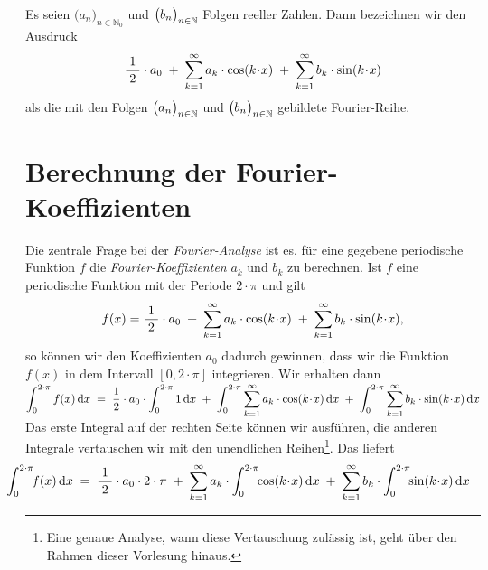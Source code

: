 \begin{Definition}
  Es seien $\bigl(a_n)_{n\in\mathbb{N}_0}$ und $\bigl(b_n\bigr)_{n\in\mathbb{N}}$ Folgen reeller Zahlen.  Dann bezeichnen
  wir den Ausdruck
  \begin{equation}
    \label{eq:fourier}
    \displaystyle\frac{\;\displaystyle1\;}{\;\displaystyle2\;}\cdot a_0 \;+\; \sum\limits_{k=1}^\infty a_k\cdot \cos(k\!\cdot\!x) \;+\;
                               \sum\limits_{k=1}^\infty b_k\cdot \sin(k\!\cdot\!x) 
  \end{equation}
  als die mit den Folgen $\bigl(a_n\bigr)_{n\in\mathbb{N}}$ und $\bigl(b_n\bigr)_{n\in\mathbb{N}}$ gebildete Fourier-Reihe.
\end{Definition}

\section{Berechnung der Fourier-Koeffizienten}
Die zentrale Frage bei der \emph{Fourier-Analyse} ist es, f\"ur eine gegebene periodische Funktion
$f$ die \emph{Fourier-Koeffizienten} $a_k$ und $b_k$ zu berechnen.   Ist $f$ eine
periodische Funktion mit der Periode $2\cdot\pi$ und gilt 
\begin{equation}
  \label{eq:fourierEq}
    f(x) = \displaystyle\frac{\;\displaystyle1\;}{\;\displaystyle2\;}\cdot a_0 \;+\; \sum\limits_{k=1}^\infty a_k\cdot \cos(k\!\cdot\!x) \;+\;
                                      \sum\limits_{k=1}^\infty b_k\cdot \sin(k\!\cdot\!x), 
\end{equation}
so k\"onnen wir den Koeffizienten $a_0$ dadurch gewinnen, dass wir die Funktion $f(x)$ in
dem Intervall $[0,2\cdot\pi]$ integrieren.  Wir erhalten dann
\\[0.3cm]
\hspace*{0.8cm}
$\displaystyle \int_0^{2\cdot\pi}f(x)\,\textrm{d} x \; = \; 
    \frac{1}{2}\cdot a_0 \cdot \int_0^{2\cdot\pi} 1\,\textrm{d} x \;+\; 
    \int_0^{2\cdot\pi} \sum\limits_{k=1}^\infty a_k\cdot \cos(k\!\cdot\!x) \,\textrm{d} x \;+\;
    \int_0^{2\cdot\pi} \sum\limits_{k=1}^\infty b_k\cdot \sin(k\!\cdot\!x) \,\textrm{d} x 
$
\\[0.3cm]
Das erste Integral auf der rechten Seite k\"onnen wir ausf\"uhren, die anderen Integrale
vertauschen wir mit den unendlichen Reihen\footnote{
Eine genaue Analyse, wann diese Vertauschung zul\"assig ist, geht \"uber den Rahmen dieser Vorlesung hinaus.}.
Das liefert
\begin{equation}
  \label{eq:fourierEq1}
\hspace*{-0.8cm}  
\int_0^{2\cdot\pi}\!\!f(x)\,\dr x \; = \; 
    \bruch{1}{2}\cdot a_0 \cdot 2\cdot\pi \;+\; 
                          \sum\limits_{k=1}^\infty a_k\cdot \int_0^{2\cdot\pi} \!\! \cos(k\!\cdot\!x) \,\dr x \;+\;
                          \sum\limits_{k=1}^\infty b_k\cdot \int_0^{2\cdot\pi} \!\! \sin(k\!\cdot\!x) \,\dr x 
\end{equation}
